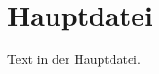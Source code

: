 \documentclass{article}
\begin{document}
\section{Hauptdatei}
Text in der Hauptdatei.


\end{document}
